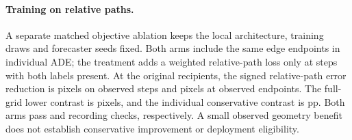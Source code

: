 \paragraph{Training on relative paths.}
A separate matched objective ablation keeps the local
architecture, training draws and forecaster seeds fixed.
Both arms include the same edge endpoints in individual ADE;
the treatment adds a weighted relative-path loss only at
steps with both labels present. At the original recipients,
the signed relative-path error reduction is
\PairTrainedObserved{} pixels on observed steps and
\PairTrainedEnd{} pixels at observed endpoints. The
full-grid lower contrast is \PairTrainedLower{} pixels,
and the individual conservative contrast is
\PairTrainedUtility{} pp. Both arms pass
\IndividualPass{} and \PairTrainedPass{} recording checks,
respectively. A small observed geometry benefit does not
establish conservative improvement or deployment eligibility.
